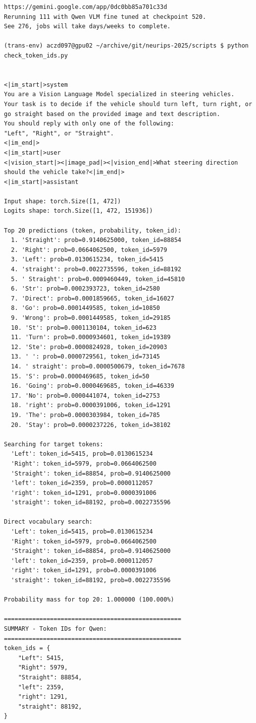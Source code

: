 \begin{verbatim}
https://gemini.google.com/app/0dc0bb85a701c33d
Rerunning 111 with Qwen VLM fine tuned at checkpoint 520.
See 276, jobs will take days/weeks to complete.

(trans-env) aczd097@gpu02 ~/archive/git/neurips-2025/scripts $ python check_token_ids.py 


<|im_start|>system
You are a Vision Language Model specialized in steering vehicles.
Your task is to decide if the vehicle should turn left, turn right, or go straight based on the provided image and text description.
You should reply with only one of the following:
"Left", "Right", or "Straight".
<|im_end|>
<|im_start|>user
<|vision_start|><|image_pad|><|vision_end|>What steering direction should the vehicle take?<|im_end|>
<|im_start|>assistant

Input shape: torch.Size([1, 472])
Logits shape: torch.Size([1, 472, 151936])

Top 20 predictions (token, probability, token_id):
  1. 'Straight': prob=0.9140625000, token_id=88854
  2. 'Right': prob=0.0664062500, token_id=5979
  3. 'Left': prob=0.0130615234, token_id=5415
  4. 'straight': prob=0.0022735596, token_id=88192
  5. ' Straight': prob=0.0009460449, token_id=45810
  6. 'Str': prob=0.0002393723, token_id=2580
  7. 'Direct': prob=0.0001859665, token_id=16027
  8. 'Go': prob=0.0001449585, token_id=10850
  9. 'Wrong': prob=0.0001449585, token_id=29185
  10. 'St': prob=0.0001130104, token_id=623
  11. 'Turn': prob=0.0000934601, token_id=19389
  12. 'Ste': prob=0.0000824928, token_id=20903
  13. ' ': prob=0.0000729561, token_id=73145
  14. ' straight': prob=0.0000500679, token_id=7678
  15. 'S': prob=0.0000469685, token_id=50
  16. 'Going': prob=0.0000469685, token_id=46339
  17. 'No': prob=0.0000441074, token_id=2753
  18. 'right': prob=0.0000391006, token_id=1291
  19. 'The': prob=0.0000303984, token_id=785
  20. 'Stay': prob=0.0000237226, token_id=38102

Searching for target tokens:
  'Left': token_id=5415, prob=0.0130615234
  'Right': token_id=5979, prob=0.0664062500
  'Straight': token_id=88854, prob=0.9140625000
  'left': token_id=2359, prob=0.0000112057
  'right': token_id=1291, prob=0.0000391006
  'straight': token_id=88192, prob=0.0022735596

Direct vocabulary search:
  'Left': token_id=5415, prob=0.0130615234
  'Right': token_id=5979, prob=0.0664062500
  'Straight': token_id=88854, prob=0.9140625000
  'left': token_id=2359, prob=0.0000112057
  'right': token_id=1291, prob=0.0000391006
  'straight': token_id=88192, prob=0.0022735596

Probability mass for top 20: 1.000000 (100.000%)

==================================================
SUMMARY - Token IDs for Qwen:
==================================================
token_ids = {
    "Left": 5415,
    "Right": 5979,
    "Straight": 88854,
    "left": 2359,
    "right": 1291,
    "straight": 88192,
}

    
\end{verbatim}

